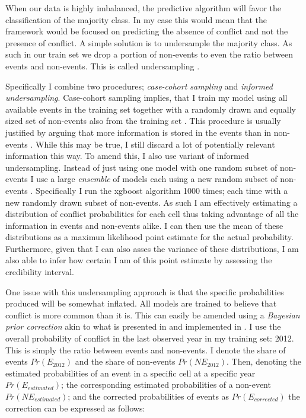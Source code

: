 \documentclass[a4paper]{article}
\begin{document}
When our data is highly imbalanced, the predictive algorithm will favor the classification of the majority class. In my case this would mean that the framework would be focused on predicting the absence of conflict and not the presence of conflict. A simple solution is to undersample the majority class. As such in our train set we drop a portion of non-events to even the ratio between events and non-events. This is called undersampling \citep[1266-1267]{He_2008}.\par


Specifically I combine two procedures; \emph{case-cohort sampling} and \emph{informed undersampling}. Case-cohort sampling implies, that I train my model using all available events in the training set together with a randomly drawn and equally sized set of non-events also from the training set \citep[142]{King_Zeng_2001}. This procedure is usually justified by arguing that more information is stored in the events than in non-events \cite[139]{King_Zeng_2001}. While this may be true, I still discard a lot of potentially relevant information this way. To amend this, I also use variant of informed undersampling. Instead of just using one model with one random subset of non-events I use a large \emph{ensemble} of models each using a new random subset of non-events \cite[1267]{He_2008}. Specifically I run the xgboost algorithm 1000 times; each time with a new randomly drawn subset of non-events. As such I am effectively estimating a distribution of conflict probabilities for each cell thus taking advantage of all the information in events and non-events alike. I can then use the mean of these distributions as a maximun likelihood point estimate for the actual probability. Furthermore, given that I can also asses the variance of these distributions, I am also able to infer how certain I am of this point estimate by assessing the credibility interval.\par 

One issue with this undersampling approach is that the specific probabilities produced will be somewhat inflated. All models are trained to believe that conflict is more common than it is. This can easily be amended using a \emph{Bayesian prior correction} akin to what is presented in \cite{King_Zeng_2001, king_zeng_2001b} and implemented in \cite{Goldstone_2010}. I use the overall probability of conflict in the last observed year in my training set: 2012. This is simply the ratio between events and non-events. I denote the share of events $Pr(E_{2012})$ and the share of non-events $Pr(NE_{2012})$. Then, denoting the estimated probabilities of an event in a specific cell at a specific year $Pr(E_{estimated})$; the corresponding estimated probabilities of a non-event $Pr(NE_{estimated})$; and the corrected probabilities of events as $Pr(E_{corrected})$ the correction can be expressed as follows:
\end{document}

